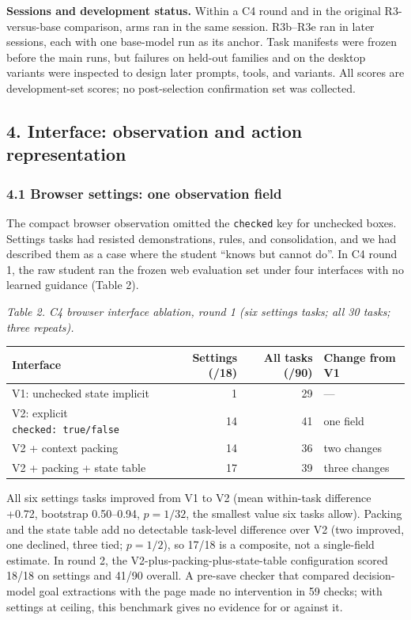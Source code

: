 \documentclass[
  10pt,
]{article}
\newcounter{none} %
\begin{document}
\textbf{Sessions and development status.} Within a C4 round and in the
original R3-versus-base comparison, arms ran in the same session.
R3b--R3e ran in later sessions, each with one base-model run as its
anchor. Task manifests were frozen before the main runs, but failures on
held-out families and on the desktop variants were inspected to design
later prompts, tools, and variants. All scores are development-set
scores; no post-selection confirmation set was collected.

\subsection{4. Interface: observation and action
representation}\label{interface-observation-and-action-representation}

\subsubsection{4.1 Browser settings: one observation
field}\label{browser-settings-one-observation-field}

The compact browser observation omitted the \texttt{checked} key for
unchecked boxes. Settings tasks had resisted demonstrations, rules, and
consolidation, and we had described them as a case where the student
``knows but cannot do''. In C4 round 1, the raw student ran the frozen
web evaluation set under four interfaces with no learned guidance (Table
2).

\emph{Table 2. C4 browser interface ablation, round 1 (six settings
tasks; all 30 tasks; three repeats).}

{\def\LTcaptype{none} %
\begin{longtable}[]{@{}lrrl@{}}
\toprule\noalign{}
Interface & Settings (/18) & All tasks (/90) & Change from V1 \\
\midrule\noalign{}
\endhead
\bottomrule\noalign{}
\endlastfoot
V1: unchecked state implicit & 1 & 29 & --- \\
V2: explicit \texttt{checked:\ true/false} & 14 & 41 & one field \\
V2 + context packing & 14 & 36 & two changes \\
V2 + packing + state table & 17 & 39 & three changes \\
\end{longtable}
}

All six settings tasks improved from V1 to V2 (mean within-task
difference +0.72, bootstrap 0.50--0.94, \(p=1/32\), the smallest value
six tasks allow). Packing and the state table add no detectable
task-level difference over V2 (two improved, one declined, three tied;
\(p=1/2\)), so 17/18 is a composite, not a single-field estimate. In
round 2, the V2-plus-packing-plus-state-table configuration scored 18/18
on settings and 41/90 overall. A pre-save checker that compared
decision-model goal extractions with the page made no intervention in 59
checks; with settings at ceiling, this benchmark gives no evidence for
or against it.
\end{document}

